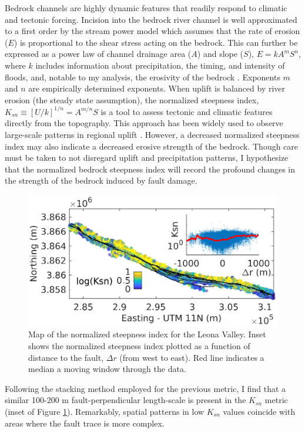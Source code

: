\documentclass[12pt, notitlepage]{report}
\begin{document}
Bedrock channels are highly dynamic features that readily respond to climatic and tectonic forcing. Incision into the bedrock river channel is well approximated to a first order by the stream power model which assumes that the rate of erosion ($E$) is proportional to the shear stress acting on the bedrock. This can further be expressed as a power law of channel drainage area ($A$) and slope ($S$), $E = kA^mS^n$, where $k$ includes information about precipitation, the timing, and intensity of floods, and, notable to my analysis, the erosivity of the bedrock \cite{Whipple1999DynamicsNeeds}. Exponents $m$ and $n$ are empirically determined exponents. When uplift is balanced by river erosion (the steady state assumption), the normalized steepness index, $K_{sn} \equiv  [U/k]^{1/n} = A^{m/n}S$ is a tool to assess tectonic and climatic features directly from the topography. This approach has been widely used to observe large-scale patterns in regional uplift \cite{Whipple1999DynamicsNeeds, Whipple2004b}. However, a decreased normalized steepness index may also indicate a decreased erosive strength of the bedrock. Though care must be taken to not disregard uplift and precipitation patterns, I hypothesize that the normalized bedrock steepness index will record the profound changes in the strength of the bedrock induced by fault damage.

%
\begin{figure}
    \centering
    \includegraphics[trim={0.1cm 1.3cm 1.2cm 1.8cm},clip]{figures/ksn_map.eps}
    \caption{Map of the normalized steepness index for the Leona Valley. Inset shows the normalized steepness index plotted as a function of distance to the fault, $\Delta r$ (from west to east). Red line indicates a median a moving window through the data.}
    \label{fig:ksn}
\end{figure}
%

Following the stacking method employed for the previous metric, I find that a similar 100-200 m fault-perpendicular length-scale is present in the $K_{sn}$ metric (inset of Figure \ref{fig:ksn}). Remarkably, spatial patterns in low $K_{sn}$ values coincide with areas where the fault trace is more complex. 
\end{document}
